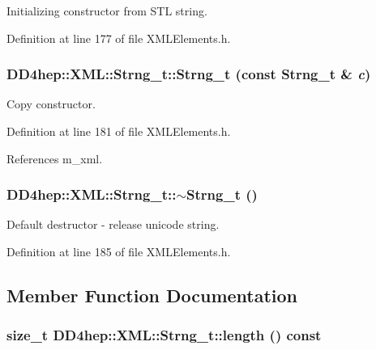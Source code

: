 Initializing constructor from STL string. 

Definition at line 177 of file XMLElements.h.\hypertarget{class_d_d4hep_1_1_x_m_l_1_1_strng__t_a44f256b1244bd55f56668be6df3550c9}{
\subsubsection[{Strng\_\-t}]{\setlength{\rightskip}{0pt plus 5cm}DD4hep::XML::Strng\_\-t::Strng\_\-t (const {\bf Strng\_\-t} \& {\em c})}}
\label{class_d_d4hep_1_1_x_m_l_1_1_strng__t_a44f256b1244bd55f56668be6df3550c9}


Copy constructor. 

Definition at line 181 of file XMLElements.h.

References m\_\-xml.\hypertarget{class_d_d4hep_1_1_x_m_l_1_1_strng__t_a0538fed420113f555a2f8ec389b131df}{
\subsubsection[{$\sim$Strng\_\-t}]{\setlength{\rightskip}{0pt plus 5cm}DD4hep::XML::Strng\_\-t::$\sim$Strng\_\-t ()}}
\label{class_d_d4hep_1_1_x_m_l_1_1_strng__t_a0538fed420113f555a2f8ec389b131df}


Default destructor -\/ release unicode string. 

Definition at line 185 of file XMLElements.h.

\subsection{Member Function Documentation}
\hypertarget{class_d_d4hep_1_1_x_m_l_1_1_strng__t_afd9aad27082a3bb52dac4a6cda2355f4}{
\subsubsection[{length}]{\setlength{\rightskip}{0pt plus 5cm}size\_\-t DD4hep::XML::Strng\_\-t::length () const}}
\label{class_d_d4hep_1_1_x_m_l_1_1_strng__t_afd9aad27082a3bb52dac4a6cda2355f4}


